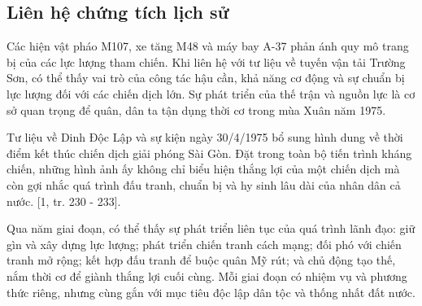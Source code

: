 \subsection{Liên hệ chứng tích lịch sử}

Các hiện vật pháo M107, xe tăng M48 và máy bay A-37 phản ánh quy mô trang bị của các lực lượng tham chiến. Khi liên hệ với tư liệu về tuyến vận tải Trường Sơn, có thể thấy vai trò của công tác hậu cần, khả năng cơ động và sự chuẩn bị lực lượng đối với các chiến dịch lớn. Sự phát triển của thế trận và nguồn lực là cơ sở quan trọng để quân, dân ta tận dụng thời cơ trong mùa Xuân năm 1975.

Tư liệu về Dinh Độc Lập và sự kiện ngày 30/4/1975 bổ sung hình dung về thời điểm kết thúc chiến dịch giải phóng Sài Gòn. Đặt trong toàn bộ tiến trình kháng chiến, những hình ảnh ấy không chỉ biểu hiện thắng lợi của một chiến dịch mà còn gợi nhắc quá trình đấu tranh, chuẩn bị và hy sinh lâu dài của nhân dân cả nước. [1, tr. 230 - 233].

Qua năm giai đoạn, có thể thấy sự phát triển liên tục của quá trình lãnh đạo: giữ gìn và xây dựng lực lượng; phát triển chiến tranh cách mạng; đối phó với chiến tranh mở rộng; kết hợp đấu tranh để buộc quân Mỹ rút; và chủ động tạo thế, nắm thời cơ để giành thắng lợi cuối cùng. Mỗi giai đoạn có nhiệm vụ và phương thức riêng, nhưng cùng gắn với mục tiêu độc lập dân tộc và thống nhất đất nước.

\clearpage
